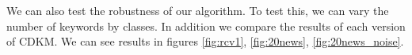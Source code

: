 We can also test the robustness of our algorithm. To test this, we
can vary the number of keywords by classes. In addition we compare
the results of each version of CDKM.
We can see results  in 
figures \ref{fig:rcv1}, \ref{fig:20news}, \ref{fig:20news_noise}.
\begin{figure}
  \begin{subfigure}[b]{\hsize}
    \centering
  \end{subfigure}
  \begin{subfigure}[b]{\hsize}
    \centering
  \end{subfigure}
  \begin{subfigure}[b]{\hsize}

\end{subfigure}
\end{figure}

